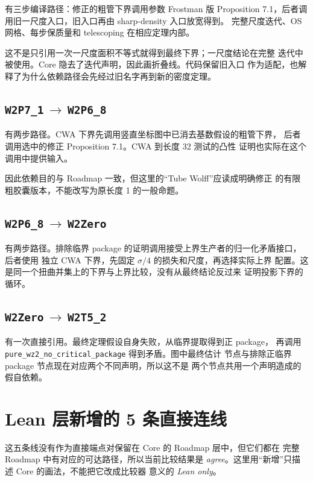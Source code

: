 \documentclass[UTF8,11pt,a4paper,fontset=none]{ctexart}
\DeclareRobustCommand{\id}[1]{\nolinkurl{#1}}
\newcommand{\arr}[2]{\id{#1}\,$\longrightarrow$\,\id{#2}}
\begin{document}
有三步编译路径：修正的粗管下界调用参数 Frostman 版 Proposition
7.1，后者调用旧一尺度入口，旧入口再由 sharp-density 入口放宽得到。
完整尺度迭代、OS 网格、每步保质量和 telescoping 在相应定理内部。

这不是只引用一次一尺度面积不等式就得到最终下界；一尺度结论在完整
迭代中被使用。Core 隐去了迭代声明，因此画折叠线。代码保留旧入口
作为适配，也解释了为什么依赖路径会先经过旧名字再到新的密度定理。

\subsection{\texorpdfstring{\arr{W2P7_1}{W2P6_8}}{W2P7\_1 到 W2P6\_8}}

有两步路径。CWA 下界先调用竖直坐标图中已消去基数假设的粗管下界，
后者调用选中的修正 Proposition 7.1。CWA 到长度 32 测试的凸性
证明也实际在这个调用中提供输入。

因此依赖目的与 Roadmap 一致，但这里的“Tube Wolff”应读成明确修正
的有限粗胶囊版本，不能改写为原长度 1 的一般命题。

\subsection{\texorpdfstring{\arr{W2P6_8}{W2Zero}}{W2P6\_8 到 W2Zero}}

有两步路径。排除临界 package 的证明调用接受上界生产者的归一化矛盾接口，后者使用
独立 CWA 下界，先固定 $\sigma/4$ 的损失和尺度，再选择实际上界
配置。这是同一个扭曲并集上的下界与上界比较，没有从最终结论反过来
证明投影下界的循环。

\subsection{\texorpdfstring{\arr{W2Zero}{W2T5_2}}{W2Zero 到 W2T5\_2}}

有一次直接引用。最终定理假设自身失败，从临界提取得到正 package，
再调用 \id{pure_wz2_no_critical_package} 得到矛盾。图中最终估计
节点与排除正临界 package 节点现在对应两个不同声明，所以这不是
两个节点共用一个声明造成的假自依赖。

\section{Lean 层新增的 5 条直接连线}

这五条线没有作为直接端点对保留在 Core 的 Roadmap 层中，但它们都在
完整 Roadmap 中有对应的可达路径，所以当前比较结果是
\emph{agree}。这里用“新增”只描述 Core 的画法，不能把它改成比较器
意义的 \emph{Lean only}。
\end{document}
